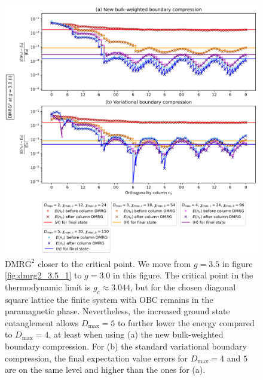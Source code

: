 \newpage
\vspace*{\fill}
\begin{figure}[H]
  \centering
  \includegraphics[width=1.0\linewidth]{dmrg_6_6_3.0_1.png}
  \caption{$\text{DMRG}^2$ closer to the critical point. We move from $g = 3.5$ in figure \ref{fig:dmrg2_3.5_1} to $g = 3.0$ in this figure. The critical point in the thermodynamic limit is $g_c \approx 3.044$, but for the chosen diagonal square lattice the finite system with OBC remains in the paramagnetic phase. Nevertheless, the increased ground state entanglement allows $D_{\text{max}} = 5$ to further lower the energy compared to $D_{\text{max}} = 4$, at least when using (a) the new bulk-weighted boundary compression. For (b) the standard variational boundary compression, the final expectation value errors for $D_{\text{max}} = 4$ and $5$ are on the same level and higher than the ones for (a).}
\label{fig:dmrg2_3.0_1}
\end{figure}
\vspace*{\fill}

